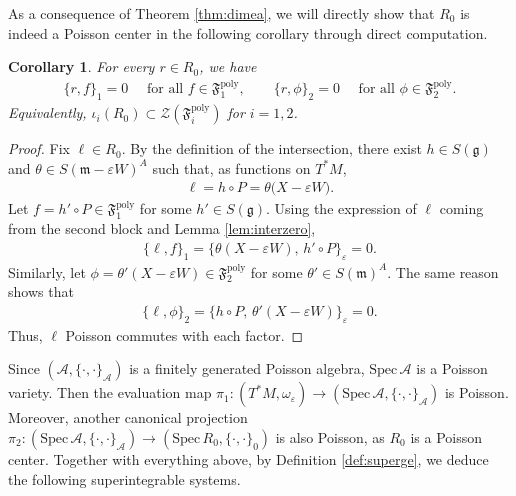 \documentclass[11pt]{amsart}
\theoremstyle{definition}
\theoremstyle{plain}
\newtheorem{corollary}[theorem]{Corollary}
\newtheorem{remark}[theorem]{Remark}
\theoremstyle{conclusion}
\begin{document}

As a consequence of Theorem \eqref{thm:dimea}, we will directly show that $R_0$ is indeed a Poisson center in the following corollary through direct computation. 
 
\begin{corollary}
\label{coro:check}
    For every $r\in R_0$, we have \begin{align*}
\{r,f\}_1=0\quad \text{ for all } f\in \mathfrak{F}_1^{\mathrm{poly}},\qquad \{r,\phi\}_2=0\quad \text{ for all } \phi\in \mathfrak{F}_2^{\mathrm{poly}}.
\end{align*} Equivalently, $\iota_i(R_0)\subset \mathcal{Z}(\mathfrak{F}_i^{\mathrm{poly}})$ for $i=1,2$.
\end{corollary} 
\begin{proof}
Fix $\ell \in R_0$. By the definition of the intersection, there exist $h\in S(\mathfrak{g})$ and $\theta\in S(\mathfrak{m} - \varepsilon W)^A$ such that, as functions on $T^*M$,\begin{align*}
\ell=h\circ P=\theta\bigl(X-\varepsilon W\bigr).
\end{align*} Let $f = h'\circ P\in \mathfrak{F}_1^{\mathrm{poly}}$ for some $h'\in S(\mathfrak{g})$. Using the expression of $\ell$ coming from the second block and Lemma \ref{lem:interzero}, \begin{align*}
\{\ell,f\}_1=\bigl\{\theta(X-\varepsilon W),\,h'\circ P\bigr\}_\varepsilon=0.
\end{align*}
Similarly, let $\phi=\theta'(X-\varepsilon W)\in \mathfrak{F}_2^{\mathrm{poly}}$ for some $\theta'\in S(\mathfrak{m})^A$. The same reason shows that \begin{align*}
\{\ell,\phi\}_2=\bigl\{h\circ P,\,\theta'(X-\varepsilon W)\bigr\}_\varepsilon=0.
\end{align*} Thus, $\ell$ Poisson commutes with each factor.
\end{proof}
  

Since $(\mathcal{A},\{\cdot,\cdot\}_\mathcal{A})$ is a finitely generated Poisson algebra, $\mathrm{Spec}\,\mathcal{A}$ is a Poisson variety. Then the evaluation map $\pi_1: (T^*M,\omega_\varepsilon) \rightarrow \left(\mathrm{Spec} \, \mathcal{A},\{\cdot,\cdot\}_{\mathcal{A}}\right)$ is Poisson. Moreover, another canonical projection $\pi_2: \left(\mathrm{Spec} \, \mathcal{A},\{\cdot,\cdot\}_{\mathcal{A}}\right) \rightarrow \left(\mathrm{Spec}\, R_0,\{\cdot,\cdot\}_0\right)$ is also Poisson, as $R_0$ is a Poisson center. Together with everything above, by Definition \ref{def:superge}, we deduce the following superintegrable systems. 
\end{document}
